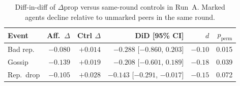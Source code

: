 \begin{table}[t]
\centering
\caption{Diff-in-diff of $\Delta\mathrm{prop}$ versus same-round controls in Run~A.
Marked agents decline relative to unmarked peers in the same round.}
\label{tab:did}
\scriptsize
\setlength{\tabcolsep}{2.2pt}
\begin{tabular}{lrrrrr}
\toprule
Event & Aff.\ $\Delta$ & Ctrl $\Delta$ & DiD [95\% CI] & $d$ & $p_{\mathrm{perm}}$ \\
\midrule
Bad rep. & $-0.080$ & $+0.014$ & $-0.288$ [$-0.860$, $0.203$] & $-0.10$ & 0.015 \\
Gossip & $-0.139$ & $+0.019$ & $-0.208$ [$-0.601$, $0.189$] & $-0.18$ & 0.039 \\
Rep.\ drop & $-0.105$ & $+0.028$ & $-0.143$ [$-0.291$, $-0.017$] & $-0.15$ & 0.072 \\
\bottomrule
\end{tabular}
\end{table}
